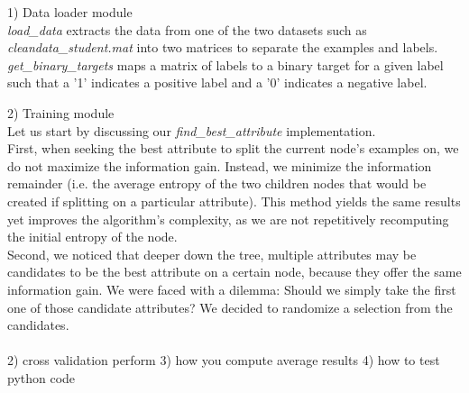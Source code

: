 
1) Data loader module\\
\emph{load\_data} extracts the data from one of the two datasets
such as \emph{cleandata\_student.mat} into two matrices to separate the examples and labels. \\
\emph{get\_binary\_targets} maps a matrix of labels to a binary target for a given label
such that a '1' indicates a positive label and a '0' indicates a negative label.

2) Training module \\
Let us start by discussing our \emph{find\_best\_attribute} implementation. \\
First, when seeking the best attribute to split the current node's examples on, we do not maximize the information gain.
Instead, we minimize the information remainder (i.e. the average entropy of the two children nodes
that would be created if splitting on a particular attribute).
This method yields the same results yet
improves the algorithm's complexity, as we are not repetitively recomputing the initial entropy of the node.\\
Second, we noticed that deeper down the tree, multiple attributes may be candidates to be the best attribute on a certain node,
because they offer the same information gain. We were faced with a dilemma: Should we simply
take the first one of those candidate attributes? We decided to randomize a selection from the candidates.\\\\


2) cross validation perform
3) how you compute average results
4) how to test python code

